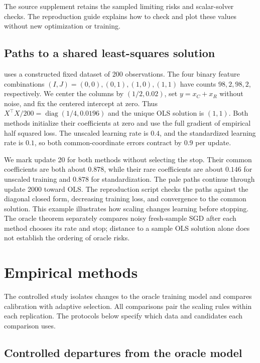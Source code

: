 \documentclass{alt2027}
\DeclareMathOperator{\diag}{diag}
\begin{document}
The source supplement retains the sampled limiting risks and scalar-solver
checks. The reproduction guide explains how to check and plot these values
without new optimization or training.

\subsection{Paths to a shared least-squares solution}

 uses a constructed fixed dataset of 200
observations. The four binary feature combinations
$(I,J) = (0,0),\allowbreak(0,1),\allowbreak(1,0),\allowbreak(1,1)$ have counts
$98,2,98,2$, respectively. We center the columns by $(1/2,0.02)$, set
$y = x_C + x_R$ without noise, and fix the centered intercept at zero. Thus
$X^\top X/200 = \diag(1/4,0.0196)$ and the unique OLS solution is $(1,1)$. Both
methods initialize their coefficients at zero and use the full gradient of
empirical half squared loss. The unscaled learning rate is $0.4$, and the
standardized learning rate is $0.1$, so both common-coordinate errors contract
by $0.9$ per update.

We mark update 20 for both methods without selecting the stop. Their common
coefficients are both about $0.878$, while their rare coefficients are about
$0.146$ for unscaled training and $0.878$ for standardization. The pale paths
continue through update 2000 toward OLS\@. The reproduction script checks the
paths against the diagonal closed form, decreasing training loss, and
convergence to the common solution. This example illustrates how scaling changes
learning before stopping. The oracle theorem separately compares noisy
fresh-sample SGD after each method chooses its rate and stop; distance to a
sample OLS solution alone does not establish the ordering of oracle risks.

\section{Empirical methods}
\label{sec:empirical-methods}

The controlled study isolates changes to the oracle training model and compares
calibration with adaptive selection. All comparisons pair the scaling rules
within each replication. The protocols below specify which data and candidates
each comparison uses.

\subsection{Controlled departures from the oracle model}
\label{sec:theory-bridge-protocol}
\end{document}
